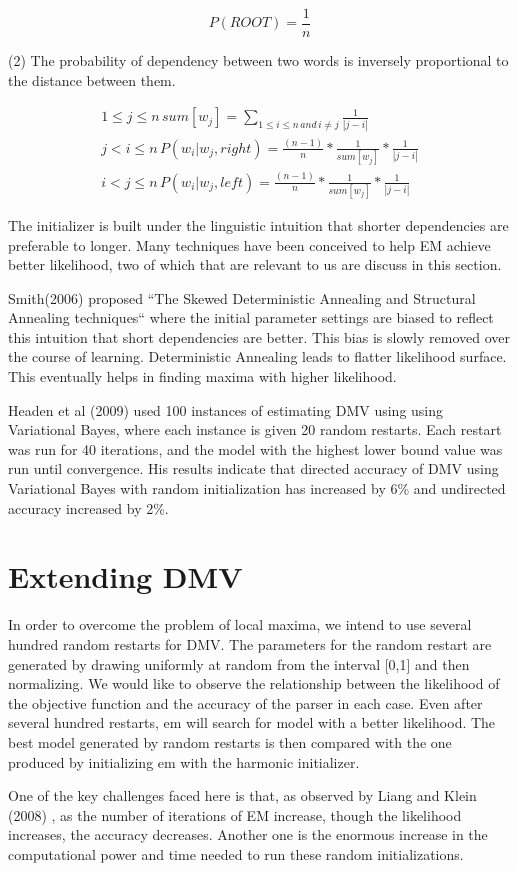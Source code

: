 \documentclass{article}
\begin{document}
   $$ P(ROOT) =  \frac{1}{n} $$

(2) The probability of dependency between two words is inversely proportional to the distance between them.

\begin{gather*}
    1 \le j \le n \, sum[w_j] = \sum_{1 \le i \le n \, and \, i \ne j} \frac{1}{|{j-i}|} \\
   j < i \le n \, P(w_i| w_j, right)  =  \frac{(n-1)}{n} * \frac{1}{sum[w_j]} * \frac{1}{|{j-i}|} \\
   i < j \le n \, P(w_i| w_j, left)  =  \frac{(n-1)}{n} * \frac{1}{sum[w_j]} * \frac{1}{|{j-i}|}
\end{gather*}

The initializer is built under the linguistic intuition that shorter dependencies are preferable to longer. Many techniques have been conceived to help EM achieve better likelihood, two of which that are relevant to us are discuss in this section.

Smith(2006) \cite{smith2006} proposed ``The Skewed Deterministic Annealing and Structural Annealing techniques`` where the initial parameter settings are biased to reflect this intuition that short dependencies are better. This bias is slowly removed over the course of learning. Deterministic Annealing leads to flatter likelihood surface. This eventually helps in finding maxima with higher likelihood.

  Headen et al (2009) \cite{headden2009} used 100 instances of estimating DMV using using Variational Bayes, where each instance is given 20 random restarts. Each restart was run for 40 iterations, and the model with the highest lower bound value was run until convergence. His results indicate that directed accuracy of DMV using Variational Bayes with random initialization has increased by 6\% and undirected accuracy increased by 2\%.

\section{Extending DMV}

 In order to overcome the problem of local maxima, we intend to use several hundred random restarts for DMV. The parameters for the random restart are generated by drawing uniformly at random from the interval [0,1] and then normalizing.  We would like to observe the relationship between the likelihood of the objective function and the accuracy of the parser in each case. Even after several hundred restarts, em will search for model with a better likelihood. The best model generated by random restarts is then compared with the one produced by initializing em with the harmonic initializer.

One of the key challenges faced here is that, as observed by Liang and Klein (2008) \cite{liang2008}, as the number of iterations of EM increase, though the likelihood increases, the accuracy decreases. Another one is the enormous increase in the computational power and time needed to run these random initializations.




\end{document}
